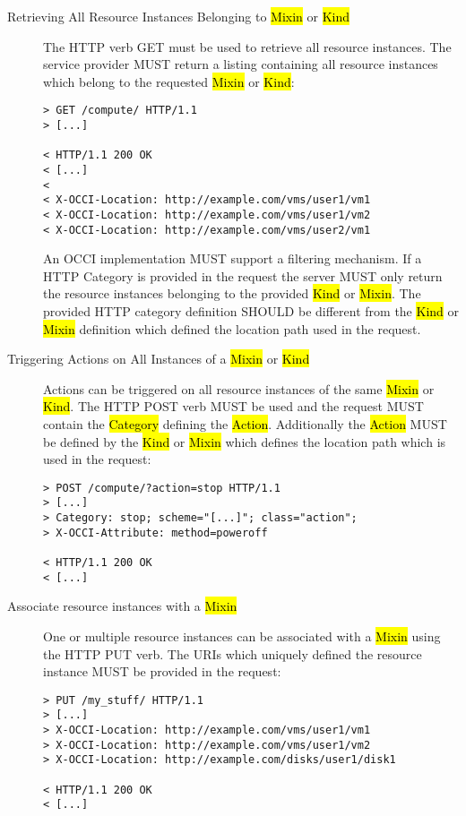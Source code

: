\documentclass[10pt,a4paper]{article}
\begin{document}
\begin{description}
\item[Retrieving All Resource Instances Belonging to \hl{Mixin} or
  \hl{Kind}] The HTTP verb GET must be used to retrieve all resource
  instances. The service provider MUST return a listing containing all
  resource instances which belong to the requested \hl{Mixin} or
  \hl{Kind}:
\begin{verbatim}
> GET /compute/ HTTP/1.1
> [...]
 
< HTTP/1.1 200 OK
< [...]
< 
< X-OCCI-Location: http://example.com/vms/user1/vm1
< X-OCCI-Location: http://example.com/vms/user1/vm2
< X-OCCI-Location: http://example.com/vms/user2/vm1
\end{verbatim}
An OCCI implementation MUST support a filtering mechanism. If a HTTP
Category is provided in the request the server MUST only return the
resource instances belonging to the provided \hl{Kind} or
\hl{Mixin}. The provided HTTP category definition SHOULD be different
from the \hl{Kind} or \hl{Mixin} definition which defined the location
path used in the request.

\item[Triggering Actions on All Instances of a \hl{Mixin} or
  \hl{Kind}] Actions can be triggered on all resource instances of the
  same \hl{Mixin} or \hl{Kind}. The HTTP POST verb MUST be used and
  the request MUST contain the \hl{Category} defining the \hl{Action}.
  Additionally
  the \hl{Action} MUST be defined by the \hl{Kind} or \hl{Mixin} which
  defines the location path which is used in the request:
\begin{verbatim}
> POST /compute/?action=stop HTTP/1.1
> [...]
> Category: stop; scheme="[...]"; class="action";
> X-OCCI-Attribute: method=poweroff

< HTTP/1.1 200 OK
< [...]
\end{verbatim}

\item[Associate resource instances with a \hl{Mixin}] One or multiple
  resource instances can be associated with a \hl{Mixin} using the
  HTTP PUT verb. The URIs which uniquely defined the resource instance
  MUST be provided in the request:
\begin{verbatim}
> PUT /my_stuff/ HTTP/1.1
> [...]
> X-OCCI-Location: http://example.com/vms/user1/vm1
> X-OCCI-Location: http://example.com/vms/user1/vm2
> X-OCCI-Location: http://example.com/disks/user1/disk1

< HTTP/1.1 200 OK
< [...]
\end{verbatim}


\end{description}
\end{document}

